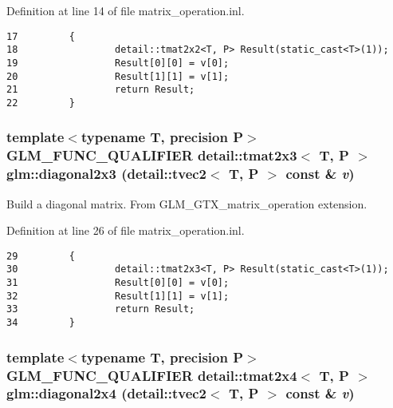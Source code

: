 Definition at line 14 of file matrix\_\-operation.inl.

\begin{Code}\begin{verbatim}17         {
18                 detail::tmat2x2<T, P> Result(static_cast<T>(1));
19                 Result[0][0] = v[0];
20                 Result[1][1] = v[1];
21                 return Result;
22         }
\end{verbatim}
\end{Code}


\hypertarget{group__gtx__matrix__operation_g1d2984ab67cc886c70b1c4993c953d09}{
\subsubsection[diagonal2x3]{\setlength{\rightskip}{0pt plus 5cm}template$<$typename T, precision P$>$ GLM\_\-FUNC\_\-QUALIFIER detail::tmat2x3$<$ T, P $>$ glm::diagonal2x3 (detail::tvec2$<$ T, P $>$ const \& {\em v})}}
\label{group__gtx__matrix__operation_g1d2984ab67cc886c70b1c4993c953d09}


Build a diagonal matrix. From GLM\_\-GTX\_\-matrix\_\-operation extension. 

Definition at line 26 of file matrix\_\-operation.inl.

\begin{Code}\begin{verbatim}29         {
30                 detail::tmat2x3<T, P> Result(static_cast<T>(1));
31                 Result[0][0] = v[0];
32                 Result[1][1] = v[1];
33                 return Result;
34         }
\end{verbatim}
\end{Code}


\hypertarget{group__gtx__matrix__operation_gfba1800a8c3e19da77cb4cd4f1bd72e6}{
\subsubsection[diagonal2x4]{\setlength{\rightskip}{0pt plus 5cm}template$<$typename T, precision P$>$ GLM\_\-FUNC\_\-QUALIFIER detail::tmat2x4$<$ T, P $>$ glm::diagonal2x4 (detail::tvec2$<$ T, P $>$ const \& {\em v})}}
\label{group__gtx__matrix__operation_gfba1800a8c3e19da77cb4cd4f1bd72e6}


